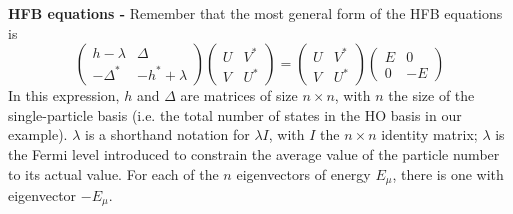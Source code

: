 {\bf HFB equations - } Remember that the most general form of the HFB equations 
is
\begin{equation}
\left( \begin{array}{cc}
h - \lambda & \Delta \\
-\Delta^{*} & -h^{*} + \lambda
\end{array} \right)
\left( \begin{array}{cc} 
U & V^{*} \\ 
V & U^{*} 
\end{array} \right)
=
\left( \begin{array}{cc} 
U & V^{*} \\ 
V & U^{*} 
\end{array} \right)
\left( \begin{array}{cc}
E & 0 \\
0 & -E
\end{array} \right)
\end{equation}
In this expression, $h$ and $\Delta$ are matrices of size $n\times n$, with $n$ 
the size of the single-particle basis (i.e. the total number of states in the 
HO basis in our example). $\lambda$ is a shorthand notation for $\lambda I$, 
with $I$ the $n\times n$ identity matrix; $\lambda$ is the Fermi level 
introduced to constrain the average value of the particle number to its actual 
value. For each of the $n$ eigenvectors of energy $E_{\mu}$, there is one with 
eigenvector $-E_{\mu}$. 

